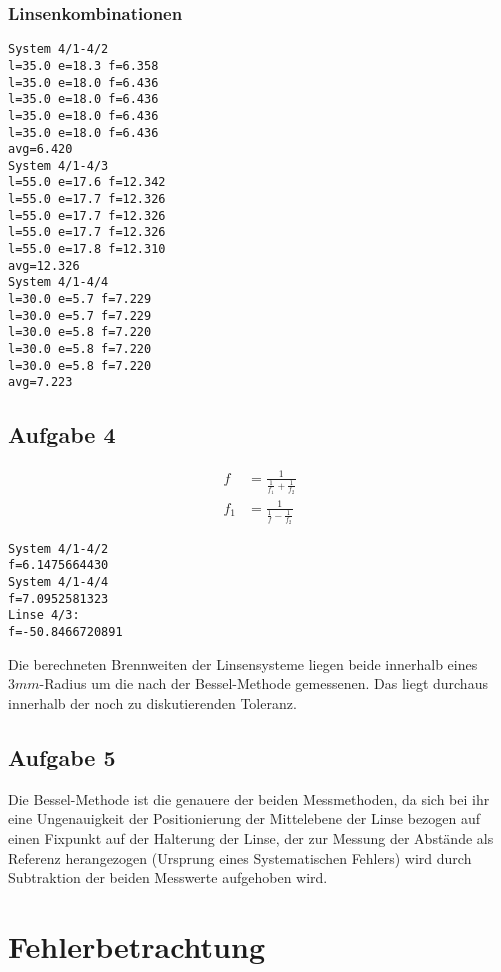 \documentclass[12pt,a4paper,notitlepage]{article}
\begin{document}
\subsubsection{Linsenkombinationen}
\begin{verbatim}
System 4/1-4/2
l=35.0 e=18.3 f=6.358
l=35.0 e=18.0 f=6.436
l=35.0 e=18.0 f=6.436
l=35.0 e=18.0 f=6.436
l=35.0 e=18.0 f=6.436
avg=6.420
System 4/1-4/3
l=55.0 e=17.6 f=12.342
l=55.0 e=17.7 f=12.326
l=55.0 e=17.7 f=12.326
l=55.0 e=17.7 f=12.326
l=55.0 e=17.8 f=12.310
avg=12.326
System 4/1-4/4
l=30.0 e=5.7 f=7.229
l=30.0 e=5.7 f=7.229
l=30.0 e=5.8 f=7.220
l=30.0 e=5.8 f=7.220
l=30.0 e=5.8 f=7.220
avg=7.223
\end{verbatim}
\subsection{Aufgabe 4}
\begin{align}
f&=\frac{1}{\frac{1}{f_1}+\frac{1}{f_2}}\\
f_1&=\frac{1}{\frac{1}{f}-\frac{1}{f_2}}
\end{align}
\begin{verbatim}
System 4/1-4/2
f=6.1475664430
System 4/1-4/4
f=7.0952581323
Linse 4/3:
f=-50.8466720891
\end{verbatim}
Die berechneten Brennweiten der Linsensysteme liegen beide innerhalb eines $3mm$-Radius um die nach der Bessel-Methode gemessenen. Das liegt durchaus innerhalb der noch zu diskutierenden Toleranz.
\subsection{Aufgabe 5}
Die Bessel-Methode ist die genauere der beiden Messmethoden, da sich bei ihr eine Ungenauigkeit  der Positionierung der Mittelebene der Linse bezogen auf einen Fixpunkt auf der Halterung der Linse, der zur Messung der Abstände als Referenz herangezogen (Ursprung eines Systematischen Fehlers) wird durch Subtraktion der beiden Messwerte aufgehoben wird.
\section{Fehlerbetrachtung}
\end{document}
